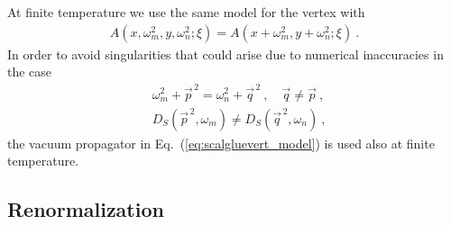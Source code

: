 \documentclass[final,twocolumn,merge,sort&compress]{elsarticle}
\def\Eq#1{Eq.~(\ref{#1})}
\begin{document}
At finite temperature we use the same model for the vertex with
\begin{eqnarray}
\label{eq:scalgluevert_model_finitet}
 A(x,\omega_m^2,y,\omega_n^2;\xi) = A(x+\omega_m^2,y+\omega_n^2;\xi)\ . \nonumber
\end{eqnarray}
In order to avoid singularities that could arise due to numerical
inaccuracies in the case
\begin{equation}
 \begin{split}
 \label{eq:singular}
  & \omega_m^2 + \vec{p}^{\,2} = \omega_n^2 + \vec{q}^{\,2}\ ,\quad \vec{q}\neq \vec{p}\ ,\\
  & D_S(\vec{p}^{\,2},\omega_m)\neq D_S(\vec{q}^{\,2},\omega_n)\ ,
 \end{split}
\end{equation}
the vacuum propagator in \Eq{eq:scalgluevert_model} is used also at
finite temperature.

\subsection{Renormalization}
\label{sec:renormalisation}



\begin{figure*}
  \centering
  \hfill
  \caption{\label{fig:scalar_condensate} Left panel: Scalar function
    $\Sigma_\varphi$, Eq.~\eqref{eq:sigma_phi_2}, as a function of the
    boundary conditions for different temperatures ($\mu = 4$ GeV and
    $m = 1.5$ GeV). Right panel: Normalized scalar condensate as a
    function of the temperature for different scalar masses $m$ and
    fit parameter $d_1$ for the scalar-gluon vertex
    \Eq{eq:scalgluevert_model}.}
\end{figure*}
\end{document}
